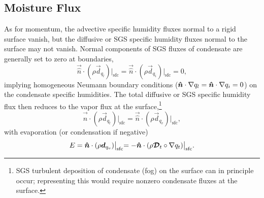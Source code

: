 \documentclass{report}
\begin{document}
\subsection{Moisture Flux}\label{s:bc_moisture_flux}

As for momentum, the advective specific humidity fluxes normal to a rigid surface vanish, but the diffusive or SGS specific humidity fluxes normal to the surface may not vanish. Normal components of SGS fluxes of condensate are generally set to zero at boundaries,
\begin{equation}\label{e:sfc_condensate_flux}
\vec{\hat n} \cdot (\rho \vec{d}_{q_{l}})\bigl|_\mathrm{sfc} = \vec{\hat n} \cdot (\rho \vec{d}_{q_{i}})\bigl|_\mathrm{sfc} = 0,
\end{equation}
implying homogeneous Neumann boundary conditions ($\boldsymbol{{\hat n}}\cdot\nabla q_l = \boldsymbol{{\hat n}}\cdot\nabla q_i = 0$) on the condensate specific humidities. The total diffusive or SGS specific humidity flux then reduces to the vapor flux at the surface,\footnote{SGS turbulent deposition of condensate (fog) on the surface can in principle occur; representing this would require nonzero condensate fluxes at the surface.}
\[
\vec{\hat n} \cdot (\rho \vec{d}_{q_{t}})\bigl|_\mathrm{sfc} = \vec{\hat n} \cdot (\rho \vec{d}_{q_{v}})\bigl|_\mathrm{sfc},
\]
with evaporation (or condensation if negative)
\[
E = \boldsymbol{{\hat n}} \cdot (\rho \boldsymbol{{d}}_{q_{v}})\bigl|_\mathrm{sfc} = -\boldsymbol{{\hat n}} \cdot (\rho \boldsymbol{{\mathcal{D}}}_t \circ \nabla q_t)\bigl|_\mathrm{sfc}.
\]
\end{document}
